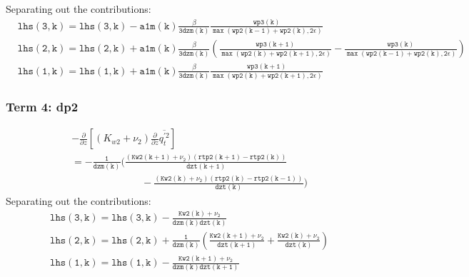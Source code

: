\documentclass[11pt,fleqn]{article}
\newcommand{\ptlder}[2]{\frac{\partial #1}{\partial #2}}
\begin{document}
%
Separating out the contributions:
%
\begin{equation}
\begin{split}
& \mathtt{ 
   lhs(3,k) = lhs(3,k) - a1m(k)\frac{\beta}{3 dzm(k)}
                 \frac{wp3(k)}
                      {\max\left(wp2(k-1)+wp2(k),2\epsilon\right)}
  } \\
& \mathtt{
   lhs(2,k) = lhs(2,k) + a1m(k)\frac{\beta}{3 dzm(k)}
                 \left(
                   \frac{wp3(k+1)}
                        {\max\left(wp2(k)+wp2(k+1),2\epsilon\right)}
                  -\frac{wp3(k)}
                        {\max\left(wp2(k-1)+wp2(k),2\epsilon\right)}
                 \right)
  } \\
& \mathtt{
   lhs(1,k) = lhs(1,k) + a1m(k)\frac{\beta}{3 dzm(k)}
                 \frac{wp3(k+1)}
                      {\max\left(wp2(k)+wp2(k+1),2\epsilon\right)}
  }
\end{split}
\end{equation}
 
\subsubsection{Term 4:  dp2}

\begin{equation}
\begin{split}
& - \ptlder{}{z} \left[ \left( K_{w2} + \nu_2 \right)
                        \ptlder{}{z} \overline{q_t^{'2}}
                 \right]  \\
 &= \mathtt{
    -\frac{1}{dzm(k)}
     \bigg( \frac{ \left( Kw2(k+1) + \nu_2 \right)
                   \left( rtp2(k+1) - rtp2(k) \right)} {dzt(k+1)}  }  \\
 &  \mathtt{ \qquad \qquad \qquad \quad
           -\frac{ \left( Kw2(k) + \nu_2 \right)
                   \left( rtp2(k) - rtp2(k-1) \right)} {dzt(k)}
     \bigg)
    }
\end{split}
\end{equation}
%
Separating out the contributions:
%
\begin{equation}
\begin{split}
&\mathtt{lhs(3,k) = lhs(3,k) - \frac{Kw2(k)+\nu_2}{dzm(k)dzt(k)} } \\
&\mathtt{lhs(2,k) = lhs(2,k) + \frac{1}{dzm(k)}
                               \left(   \frac{Kw2(k+1)+\nu_2}{dzt(k+1)}
                                      + \frac{Kw2(k)+\nu_2}{dzt(k)} \right) } \\
&\mathtt{lhs(1,k) = lhs(1,k) - \frac{Kw2(k+1)+\nu_2}{dzm(k)dzt(k+1)} }
\end{split}
\end{equation}
\end{document}

